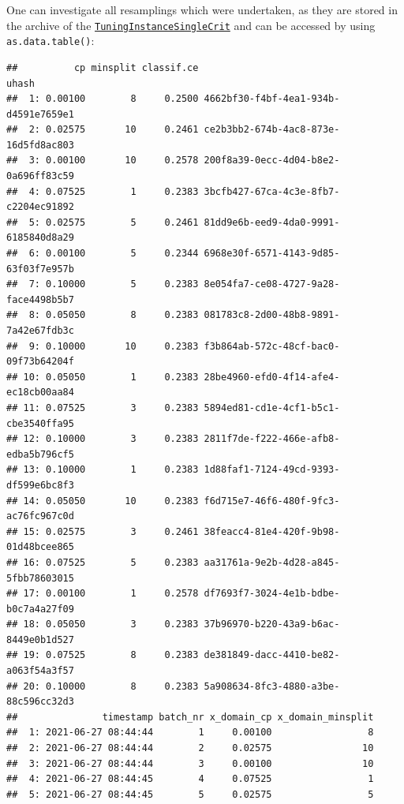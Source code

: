\documentclass[
]{scrbook}
\newenvironment{Shaded}{\begin{snugshade}}{\end{snugshade}}
\newcommand{\FunctionTok}[1]{\textcolor[rgb]{0.00,0.00,0.00}{#1}}
\newcommand{\NormalTok}[1]{#1}
\newcommand{\SpecialCharTok}[1]{\textcolor[rgb]{0.00,0.00,0.00}{#1}}
\renewenvironment{Shaded} {\begin{snugshade}\small} {\end{snugshade}}
\begin{document}
One can investigate all resamplings which were undertaken, as they are stored in the archive of the \href{https://mlr3tuning.mlr-org.com/reference/TuningInstanceSingleCrit.html}{\texttt{TuningInstanceSingleCrit}} and can be accessed by using \texttt{as.data.table()}:

\begin{Shaded}
\end{Shaded}

\begin{verbatim}
##          cp minsplit classif.ce                                uhash
##  1: 0.00100        8     0.2500 4662bf30-f4bf-4ea1-934b-d4591e7659e1
##  2: 0.02575       10     0.2461 ce2b3bb2-674b-4ac8-873e-16d5fd8ac803
##  3: 0.00100       10     0.2578 200f8a39-0ecc-4d04-b8e2-0a696ff83c59
##  4: 0.07525        1     0.2383 3bcfb427-67ca-4c3e-8fb7-c2204ec91892
##  5: 0.02575        5     0.2461 81dd9e6b-eed9-4da0-9991-6185840d8a29
##  6: 0.00100        5     0.2344 6968e30f-6571-4143-9d85-63f03f7e957b
##  7: 0.10000        5     0.2383 8e054fa7-ce08-4727-9a28-face4498b5b7
##  8: 0.05050        8     0.2383 081783c8-2d00-48b8-9891-7a42e67fdb3c
##  9: 0.10000       10     0.2383 f3b864ab-572c-48cf-bac0-09f73b64204f
## 10: 0.05050        1     0.2383 28be4960-efd0-4f14-afe4-ec18cb00aa84
## 11: 0.07525        3     0.2383 5894ed81-cd1e-4cf1-b5c1-cbe3540ffa95
## 12: 0.10000        3     0.2383 2811f7de-f222-466e-afb8-edba5b796cf5
## 13: 0.10000        1     0.2383 1d88faf1-7124-49cd-9393-df599e6bc8f3
## 14: 0.05050       10     0.2383 f6d715e7-46f6-480f-9fc3-ac76fc967c0d
## 15: 0.02575        3     0.2461 38feacc4-81e4-420f-9b98-01d48bcee865
## 16: 0.07525        5     0.2383 aa31761a-9e2b-4d28-a845-5fbb78603015
## 17: 0.00100        1     0.2578 df7693f7-3024-4e1b-bdbe-b0c7a4a27f09
## 18: 0.05050        3     0.2383 37b96970-b220-43a9-b6ac-8449e0b1d527
## 19: 0.07525        8     0.2383 de381849-dacc-4410-be82-a063f54a3f57
## 20: 0.10000        8     0.2383 5a908634-8fc3-4880-a3be-88c596cc32d3
##               timestamp batch_nr x_domain_cp x_domain_minsplit
##  1: 2021-06-27 08:44:44        1     0.00100                 8
##  2: 2021-06-27 08:44:44        2     0.02575                10
##  3: 2021-06-27 08:44:44        3     0.00100                10
##  4: 2021-06-27 08:44:45        4     0.07525                 1
##  5: 2021-06-27 08:44:45        5     0.02575                 5

\end{verbatim}
\end{document}

